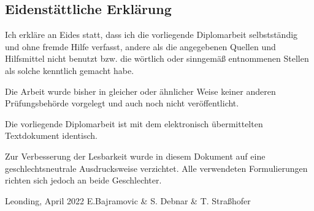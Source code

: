 \begin{spacing}{1}
    \chapter*{Eidenstättliche Erklärung}
\end{spacing}
Ich erkläre an Eides statt, dass ich die vorliegende Diplomarbeit selbstständig und ohne fremde Hilfe verfasst, andere als die angegebenen Quellen und Hilfsmittel nicht benutzt bzw. die wörtlich oder sinngemäß entnommenen Stellen als solche kenntlich gemacht habe.

Die Arbeit wurde bisher in gleicher oder ähnlicher Weise keiner anderen Prüfungsbehörde vorgelegt und auch noch nicht veröffentlicht.

Die vorliegende Diplomarbeit ist mit dem elektronisch übermittelten Textdokument identisch.

Zur Verbesserung der Lesbarkeit wurde in diesem Dokument auf eine geschlechtsneutrale Ausdrucksweise verzichtet.
Alle verwendeten Formulierungen richten sich jedoch an beide Geschlechter.


\begin{tabbing}
\doublespacing
Leonding, April 2022 \hspace{3.5cm} E.Bajramovic \& S. Debnar \& T. Straßhofer
\end{tabbing}
\vspace{10cm}
\setcounter{page}{1}

